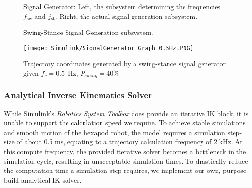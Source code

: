 
\begin{figure}[!h]
	\centerline{}
	\caption[Signal Generator]{Signal Generator: Left, the subsystem determining the frequencies $f_\text{sw}$ and $f_\text{st}$. Right, the actual signal generation subsystem.}
	\label{figure: Swing-Stance Signal Generator}
\end{figure}

\begin{figure}[!h]
	\centerline{}
	\caption[Signal Generation]{Swing-Stance Signal Generation subsystem.}
	\label{figure: Swing-Stance Signal Generation}
\end{figure}

\begin{figure}[!h]
	\centerline{\texttt{[image: Simulink/SignalGenerator\_Graph\_0.5Hz.PNG]}}
	\caption[2D Trajectory Coordinates]{Trajectory coordinates generated by a swing-stance signal generator given $f_c=0.5$\ Hz, $P_{swing}=40\text{\%}$}
	\label{figure: Trajectory graphs}
\end{figure}


\subsubsection{Analytical Inverse Kinematics Solver} \label{subsubsec: IK Solver}
While Simulink's \textit{Robotics System Toolbox} does provide an iterative IK block, it is unable to support the calculation speed we require.
To achieve stable simulations and smooth motion of the hexapod robot, the model requires a simulation step-size of about 0.5 ms, equating to a trajectory calculation frequency of 2 kHz.
At this compute frequency, the provided iterative solver becomes a bottleneck in the simulation cycle, resulting in unacceptable simulation times.
To drastically reduce the computation time a simulation step requires, we implement our own, purpose-build analytical IK solver.

